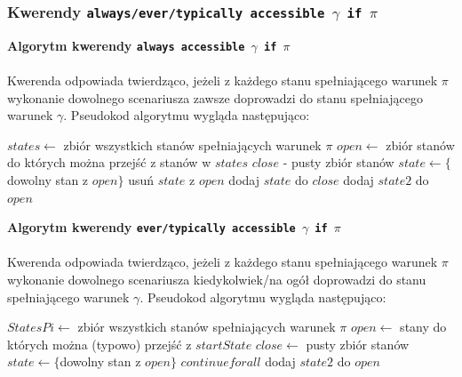 \documentclass{article}
\begin{document}
\subsubsection{Kwerendy \texttt{always/ever/typically accessible $\gamma$ if $\pi$} }
\textbf{Algorytm kwerendy \texttt{always accessible $\gamma$ if $\pi$}}\\\\
Kwerenda odpowiada twierdząco, jeżeli z każdego stanu spełniającego warunek $\pi$ wykonanie dowolnego scenariusza zawsze doprowadzi do stanu spełniającego warunek $\gamma$. Pseudokod algorytmu wygląda następująco:

\begin{algorithm}[H]
\begin{algorithmic}
\State $states \gets $ zbiór wszystkich stanów spełniających warunek $\pi$ 
\State $open \gets $ zbiór stanów do których można przejść z stanów w $states$
\State $close$ - pusty zbiór stanów
    \State $state \gets \{$dowolny stan z $open\}$
    \State usuń $state$ z $open$
	\State dodaj $state$ do $close$
		    \State dodaj $state2$ do $open$
		\EndIf
	\EndFor
\EndWhile
	    \State {}
	\EndIf
\State {}
\end{algorithmic}
\end{algorithm}
\newpage
\textbf{Algorytm kwerendy \texttt{ever/typically accessible $\gamma$ if $\pi$}}\\\\
Kwerenda odpowiada twierdząco, jeżeli z każdego stanu spełniającego warunek $\pi$ wykonanie dowolnego scenariusza kiedykolwiek/na ogół doprowadzi do stanu spełniającego warunek $\gamma$. Pseudokod algorytmu wygląda następująco:

\begin{algorithm}[H]
\begin{algorithmic}
\State $StatesPi \gets $ zbiór wszystkich stanów spełniających warunek $\pi$ 
    \State $open \gets$ stany do których można (typowo) przejść z $startState$
    \State $close \gets$ pusty zbiór stanów
        \State $state \gets \{$dowolny stan z $open\}$
            \State $continue for all$
        \EndIf
                \State dodaj $state2$ do $open$
            \EndIf
        \EndFor
    \EndWhile
    \State {}
\EndFor
\State {}
\end{algorithmic}
\end{algorithm}
\newpage
\end{document}
